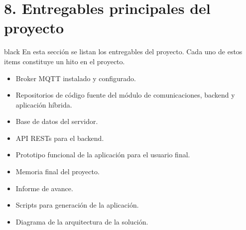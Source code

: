 \documentclass[
11pt, %
codirector, %
]{charter}
\begin{document}
\pagebreak
\section{8. Entregables principales del proyecto}
\label{sec:entregables}

\begin{consigna}{black}
En esta sección se listan los entregables del proyecto. Cada uno de estos items constituye un hito en el proyecto.
\begin{itemize}
	\item Broker MQTT instalado y configurado.
	\item Repositorios de código fuente del módulo de comunicaciones, backend y aplicación híbrida.
	\item Base de datos del servidor.
	\item API RESTs para el backend.
	\item Prototipo funcional de la aplicación para el usuario final.
	\item Memoria final del proyecto.
	\item Informe de avance.
	\item Scripts para generación de la aplicación.
	\item Diagrama de la arquitectura de la solución.
\end{itemize}

\end{consigna}
\pagebreak
\end{document}
